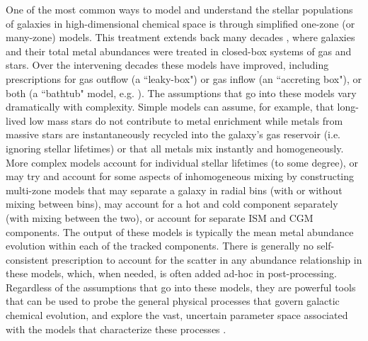 One of the most common ways to model and understand the stellar populations of galaxies in high-dimensional chemical space is through simplified one-zone (or many-zone) models. This treatment extends back many decades \citep[e.g.][]{Schmidt1963,TalbotArnett1971,Lynden-Bell1975}, where galaxies and their total metal abundances were treated in closed-box systems of gas and stars. Over the intervening decades these models have improved, including prescriptions for gas outflow (a ``leaky-box") or gas inflow (an ``accreting box"), or both (a ``bathtub" model, e.g. \cite{FinlatorDave2008,Bouche2010}). The assumptions that go into these models vary dramatically with complexity. Simple models can assume, for example, that long-lived low mass stars do not contribute to metal enrichment while metals from massive stars are instantaneously recycled into the galaxy's gas reservoir (i.e. ignoring stellar lifetimes) or that all metals mix instantly and homogeneously. More complex models account for individual stellar lifetimes (to some degree), or may try and account for some aspects of inhomogeneous mixing by constructing multi-zone models that may separate a galaxy in radial bins (with or without mixing between bins), may account for a hot and cold component separately (with mixing between the two), or account for separate ISM and CGM components. The output of these models is typically the mean metal abundance evolution within each of the tracked components. There is generally no self-consistent prescription to account for the scatter in any abundance relationship in these models, which, when needed, is often added ad-hoc in post-processing. Regardless of the assumptions that go into these models, they are powerful tools that can be used to probe the general physical processes that govern galactic chemical evolution, and explore the vast, uncertain parameter space associated with the models that characterize these processes \citep[e.g.][]{Cote2017a}.

